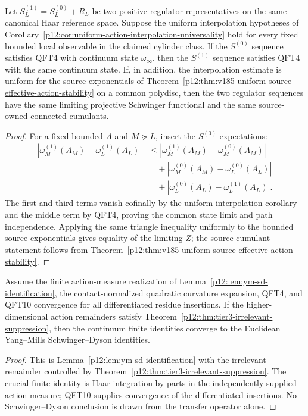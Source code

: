 \documentclass[12pt,a4paper]{article}
\begin{document}
\begin{corollary}
\label{p12:cor:v185-universality-inherits-continuum-state}
Let $S_L^{(1)}=S_L^{(0)}+R_L$ be two positive regulator representatives on
the same canonical Haar reference space.  Suppose the uniform interpolation
hypotheses of Corollary~\ref{p12:cor:uniform-action-interpolation-universality}
hold for every fixed bounded local observable in the claimed cylinder class.
If the $S^{(0)}$ sequence satisfies QFT4 with continuum state $\omega_\infty$,
then the $S^{(1)}$ sequence satisfies QFT4 with the same continuum state.
If, in addition, the interpolation estimate is uniform for the source
exponentials of Theorem~\ref{p12:thm:v185-uniform-source-effective-action-stability}
on a common polydisc, then the two regulator sequences have the same limiting
projective Schwinger functional and the same source-owned connected cumulants.
\end{corollary}
\begin{proof}
For a fixed bounded $A$ and $M\succeq L$, insert the $S^{(0)}$ expectations:
\[
 \begin{aligned}
 |\omega_M^{(1)}(A_M)-\omega_L^{(1)}(A_L)|
 &\le |\omega_M^{(1)}(A_M)-\omega_M^{(0)}(A_M)|\\
 &\quad+|\omega_M^{(0)}(A_M)-\omega_L^{(0)}(A_L)|\\
 &\quad+|\omega_L^{(0)}(A_L)-\omega_L^{(1)}(A_L)|.
 \end{aligned}
\]
The first and third terms vanish cofinally by the uniform interpolation
corollary and the middle term by QFT4, proving the common state limit and path
independence.  Applying the same triangle inequality uniformly to the bounded
source exponentials gives equality of the limiting $\widehat Z$; the source
cumulant statement follows from
Theorem~\ref{p12:thm:v185-uniform-source-effective-action-stability}.
\end{proof}

\begin{theorem}
\label{p12:thm:tier3-sd-from-ucs}
Assume the finite action-measure realization of Lemma~\ref{p12:lem:ym-sd-identification}, the contact-normalized quadratic curvature expansion, QFT4, and QFT10 convergence for all differentiated residue insertions.  If the higher-dimensional action remainders satisfy Theorem~\ref{p12:thm:tier3-irrelevant-suppression}, then the continuum finite identities converge to the Euclidean Yang--Mills Schwinger--Dyson identities.
\end{theorem}
\begin{proof}
This is Lemma~\ref{p12:lem:ym-sd-identification} with the irrelevant remainder controlled by Theorem~\ref{p12:thm:tier3-irrelevant-suppression}.  The crucial finite identity is Haar integration by parts in the independently supplied action measure; QFT10 supplies convergence of the differentiated insertions.  No Schwinger--Dyson conclusion is drawn from the transfer operator alone.
\end{proof}
\end{document}
